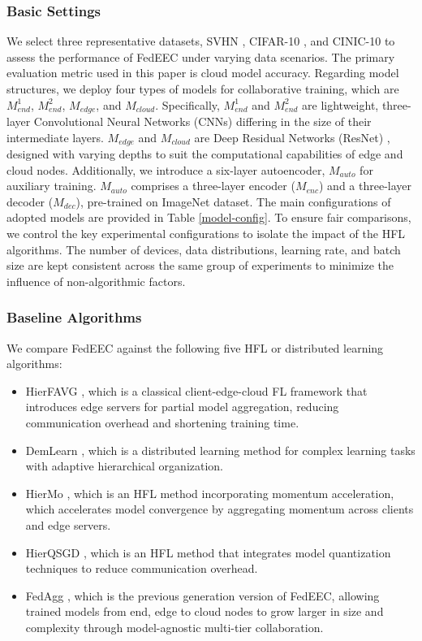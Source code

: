 \documentclass[10pt,journal]{IEEEtran}
\begin{document}
\subsubsection{Basic Settings} 
We select three representative datasets, SVHN \cite{netzer2011reading}, CIFAR-10 \cite{cifar10}, and CINIC-10 \cite{cinic10} to assess the performance of FedEEC under varying data scenarios. The primary evaluation metric used in this paper is cloud model accuracy. Regarding model structures, we deploy four types of models for collaborative training, which are $M_{end}^1$, $M_{end}^2$, $M_{edge}$, and $M_{cloud}$. Specifically, $M_{end}^1$ and $M_{end}^2$ are lightweight, three-layer Convolutional Neural Networks (CNNs) differing in the size of their intermediate layers. 
$M_{edge}$ and $M_{cloud}$ are Deep Residual Networks (ResNet) \cite{he2016deep}, designed with varying depths to suit the computational capabilities of edge and cloud nodes.
Additionally, we introduce a six-layer autoencoder, $M_{auto}$ for auxiliary training. $M_{auto}$ comprises  a three-layer encoder ($M_{enc}$) and a three-layer decoder ($M_{dec}$), pre-trained on ImageNet \cite{deng2009imagenet} dataset. The main configurations of adopted models are provided in Table \ref{model-config}.
To ensure fair comparisons, we control the key experimental configurations to isolate the impact of the HFL algorithms. The number of devices, data distributions, learning rate, and batch size are kept consistent across the same group of experiments to minimize the influence of non-algorithmic factors.


\subsubsection{Baseline Algorithms}
We compare FedEEC against the following five HFL or distributed learning algorithms:
\begin{itemize}
    \item HierFAVG \cite{liu2020client}, which is a classical client-edge-cloud FL framework that introduces edge servers for partial model aggregation, reducing communication overhead and shortening training time.
    \item DemLearn \cite{nguyen2023self}, which is a distributed learning method for complex learning tasks with adaptive hierarchical organization.
    \item HierMo \cite{yang2023hierarchical}, which is an HFL method incorporating momentum acceleration, which accelerates model convergence by aggregating momentum across clients and edge servers.
    \item HierQSGD \cite{liu2022hierarchical}, which is an HFL method that integrates model quantization techniques to reduce communication overhead.
    \item FedAgg \cite{wu2024agglomerative}, which is the previous generation version of FedEEC, allowing trained models from end, edge to cloud nodes to grow larger in size and complexity through model-agnostic multi-tier collaboration.
\end{itemize}
\end{document}
